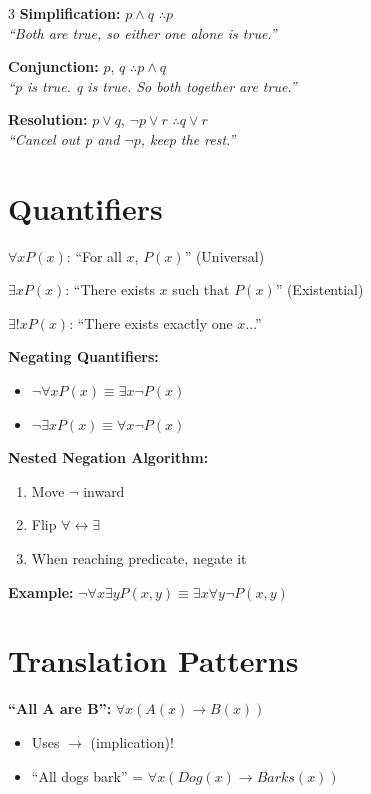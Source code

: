 \documentclass[10pt,landscape,a4paper]{article}
\newcommand{\tand}{\wedge}
\newcommand{\tor}{\vee}
\newcommand{\tnot}{\neg}
\newcommand{\timplies}{\rightarrow}
\begin{document}
\begin{multicols}{3}
\textbf{Simplification:} $p \tand q$ $\therefore p$\\
{\small \textit{``Both are true, so either one alone is true.''}}

\textbf{Conjunction:} $p$, $q$ $\therefore p \tand q$\\
{\small \textit{``p is true. q is true. So both together are true.''}}

\textbf{Resolution:} $p \tor q$, $\tnot p \tor r$ $\therefore q \tor r$\\
{\small \textit{``Cancel out p and $\tnot p$, keep the rest.''}}


\section*{Quantifiers}

$\forall x P(x)$: ``For all $x$, $P(x)$'' (Universal)

$\exists x P(x)$: ``There exists $x$ such that $P(x)$'' (Existential)

$\exists! x P(x)$: ``There exists exactly one $x$...''

\textbf{Negating Quantifiers:}
\begin{itemize}[nosep,leftmargin=*]
\item $\tnot \forall x P(x) \equiv \exists x \tnot P(x)$
\item $\tnot \exists x P(x) \equiv \forall x \tnot P(x)$
\end{itemize}

\textbf{Nested Negation Algorithm:}
\begin{enumerate}[nosep,leftmargin=*]
\item Move $\tnot$ inward
\item Flip $\forall \leftrightarrow \exists$
\item When reaching predicate, negate it
\end{enumerate}

\textbf{Example:} $\tnot \forall x \exists y P(x,y) \equiv \exists x \forall y \tnot P(x,y)$

\section*{Translation Patterns}

\textbf{``All A are B'':} $\forall x (A(x) \timplies B(x))$
\begin{itemize}[nosep,leftmargin=*]
\item Uses $\timplies$ (implication)!
\item ``All dogs bark'' = $\forall x (Dog(x) \timplies Barks(x))$
\end{itemize}


\end{multicols}
\end{document}
